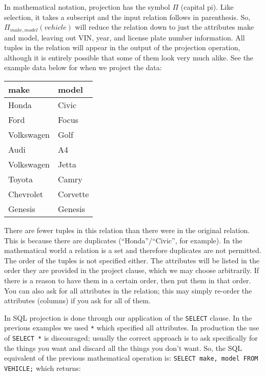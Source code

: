 In mathematical notation, projection has the symbol $\Pi$ (capital pi). Like selection, it takes a subscript and the input relation follows in parenthesis. So, $\Pi_{make, model}( vehicle )$ will reduce the relation down to just the attributes make and model, leaving out VIN, year, and license plate number information. All tuples in the relation will appear in the output of the projection operation, although it is entirely possible that some of them look very much alike. See the example data below for when we project the data:

\begin{center}
\begin{tabular}{|l|l|} \hline
\textbf{make} & \textbf{model} \\ \hline
	Honda & Civic \\ \hline
	Ford & Focus \\ \hline
	Volkswagen & Golf \\ \hline
	Audi & A4  \\ \hline
	Volkswagen & Jetta  \\ \hline
	Toyota & Camry \\ \hline
	Chevrolet & Corvette \\ \hline
	Genesis & Genesis \\ \hline
\end{tabular}
\end{center}

There are fewer tuples in this relation than there were in the original relation. This is because there are duplicates (``Honda''/``Civic'', for example). In the mathematical world a relation is a set and therefore duplicates are not permitted. The order of the tuples is not specified either. The attributes will be listed in the order they are provided in the project clause, which we may choose arbitrarily. If there is a reason to have them in a certain order, then put them in that order. You can also ask for all attributes in the relation; this may simply re-order the attributes (columns) if you ask for all of them.

In SQL projection is done through our application of the \texttt{SELECT} clause. In the previous examples we used \texttt{*} which specified all attributes. In production the use of \texttt{SELECT *} is discouraged; usually the correct approach is to ask specifically for the things you want and discard all the things you don't want. So, the SQL equivalent of the previous mathematical operation is: \texttt{SELECT make, model FROM VEHICLE;} which returns:

